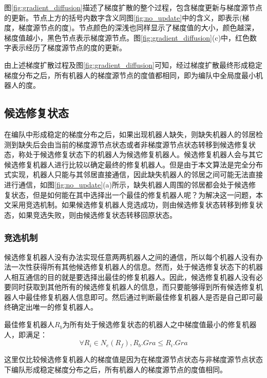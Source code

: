 图\ref{fig:gradient_diffusion}描述了梯度扩散的整个过程，包含梯度更新与梯度源节点的更新。节点上方的括号内数字含义同图\ref{fig:no_update}中的含义，即表示(梯度，梯度源节点的度)。节点颜色的深浅也同样显示了梯度值的大小，颜色越深，梯度值越小，黑色节点表示梯度源节点。图\ref{fig:gradient_diffusion}(c)中，红色数字表示经历了梯度源节点的度的更新。
\begin{figure*}[!htbp]
	\centering
	\hspace{0.5cm}
	\hspace{0.5cm}
\end{figure*}
由上述梯度扩散过程及图\ref{fig:gradient_diffusion}可知，经过梯度扩散最终形成稳定梯度分布之后，所有机器人的梯度源节点的度值都相同，即为编队中全局度最小机器人的度。

\subsection{候选修复状态}
在编队中形成稳定的梯度分布之后，如果出现机器人缺失，则缺失机器人的邻居检测到缺失后会由当前的梯度源节点状态或者非梯度源节点状态转移到候选修复状态，称处于候选修复状态下的机器人为候选修复机器人。候选修复机器人会与其它候选修复机器人进行比较以确定最终的修复机器人。但是由于本文算法是完全分布式实现，机器人只能与其邻居直接通信，因此缺失机器人的邻居之间可能无法直接进行通信，如图\ref{fig:no_update}(a)所示，缺失机器人周围的邻居都会处于候选修复状态，但是如何能在其中选择出一个最佳的修复机器人呢？为解决这一问题，本文采用竞选机制。如果候选修复机器人竞选成功，则由候选修复状态转移到修复状态，如果竞选失败，则由候选修复状态转移回原状态。

\subsubsection{竞选机制}
候选修复机器人没有办法实现任意两两机器人之间的通信，所以每个机器人没有办法一次性获得所有其他候选修复机器人的信息。然而，处于候选修复状态下的机器人相互通信的目的就是要选择出最佳的修复机器人。因此，候选修复机器人没有必要同时获取到其他所有的候选修复机器人的信息，而只要能够得到所有候选修复机器人中最佳修复机器人信息即可。然后通过判断最佳修复机器人是否是自己即可最终确定出唯一的修复机器人。
\begin{defn}
	最佳修复机器人$R_b$为所有处于候选修复状态的机器人之中梯度值最小的修复机器人，即满足：\\
	\[
		\forall R_i \in N_e(R_f), R_b.Gra \leq R_i.Gra
	\]
\end{defn}
这里仅比较候选修复机器人的梯度值是因为在梯度源节点状态与非梯度源节点状态下编队形成稳定梯度分布之后，所有机器人的梯度源节点的度值相同。

